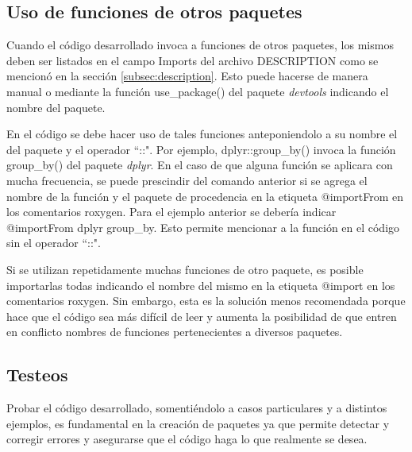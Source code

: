\subsection{Uso de funciones de otros paquetes}
Cuando el código desarrollado invoca a funciones de otros paquetes, los mismos deben ser listados en el campo Imports del archivo DESCRIPTION como se mencionó en la sección \ref{subsec:description}. Esto puede hacerse de manera manual o mediante la función \textcolor{fandango}{use\_package()} del paquete \emph{devtools} indicando el nombre del paquete.

En el código se debe hacer uso de tales funciones anteponiendolo a su nombre el del paquete y el operador ``::". Por ejemplo, \textcolor{fandango}{dplyr::group\_by()} invoca la función \textcolor{fandango}{group\_by()} del paquete \emph{dplyr}. En el caso de que alguna función se aplicara con mucha frecuencia, se puede prescindir del comando anterior si se agrega el nombre de la función y el paquete de procedencia en la etiqueta \textcolor{fandango}{@importFrom} en los comentarios roxygen. Para el ejemplo anterior se debería indicar \textcolor{fandango}{@importFrom dplyr group\_by}. Esto permite mencionar a la función en el código sin el operador ``::".

Si se utilizan repetidamente muchas funciones de otro paquete, es posible importarlas todas indicando el nombre del mismo en la etiqueta @import en los comentarios roxygen. Sin embargo, esta es la solución menos recomendada porque hace que el código sea más difícil de leer y aumenta la posibilidad de que entren en conflicto nombres de funciones pertenecientes a diversos paquetes.

\subsection{Testeos}

Probar el código desarrollado, somentiéndolo a casos particulares y a distintos ejemplos, es fundamental en la creación de paquetes ya que permite detectar y corregir errores y asegurarse que el código haga lo que realmente se desea.

